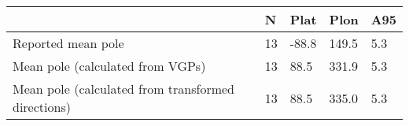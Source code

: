 \begin{tabular}{lllll}
\toprule
{} &   N &  Plat &   Plon &  A95 \\
\midrule
Reported mean pole                                 &  13 & -88.8 &  149.5 &  5.3 \\
Mean pole (calculated from VGPs)                   &  13 &  88.5 &  331.9 &  5.3 \\
Mean pole (calculated from transformed directions) &  13 &  88.5 &  335.0 &  5.3 \\
\bottomrule
\end{tabular}
